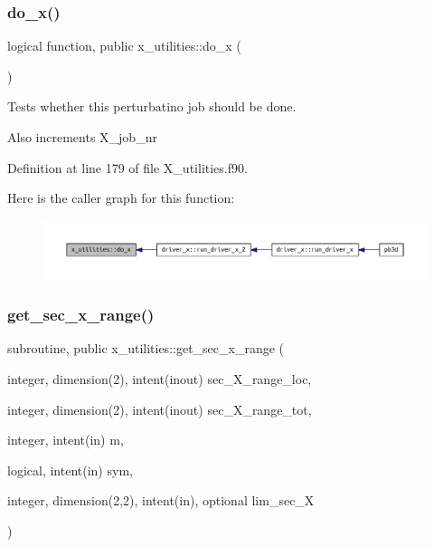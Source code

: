 \subsubsection{\texorpdfstring{do\+\_\+x()}{do\_x()}}
{\footnotesize\ttfamily logical function, public x\+\_\+utilities\+::do\+\_\+x (\begin{DoxyParamCaption}{ }\end{DoxyParamCaption})}



Tests whether this perturbatino job should be done. 

Also increments {\ttfamily X\+\_\+job\+\_\+nr} 

Definition at line 179 of file X\+\_\+utilities.\+f90.

Here is the caller graph for this function\+:
\nopagebreak
\begin{figure}[H]
\begin{center}
\leavevmode
\includegraphics[width=350pt]{namespacex__utilities_adef8eab82f0fd670a7795c754cf9a8f9_icgraph}
\end{center}
\end{figure}
\mbox{\label{namespacex__utilities_a6072ddd1fd230758795ff320c75a1f6a}} 
\subsubsection{\texorpdfstring{get\+\_\+sec\+\_\+x\+\_\+range()}{get\_sec\_x\_range()}}
{\footnotesize\ttfamily subroutine, public x\+\_\+utilities\+::get\+\_\+sec\+\_\+x\+\_\+range (\begin{DoxyParamCaption}\item[{integer, dimension(2), intent(inout)}]{sec\+\_\+\+X\+\_\+range\+\_\+loc,  }\item[{integer, dimension(2), intent(inout)}]{sec\+\_\+\+X\+\_\+range\+\_\+tot,  }\item[{integer, intent(in)}]{m,  }\item[{logical, intent(in)}]{sym,  }\item[{integer, dimension(2,2), intent(in), optional}]{lim\+\_\+sec\+\_\+X }\end{DoxyParamCaption})}



